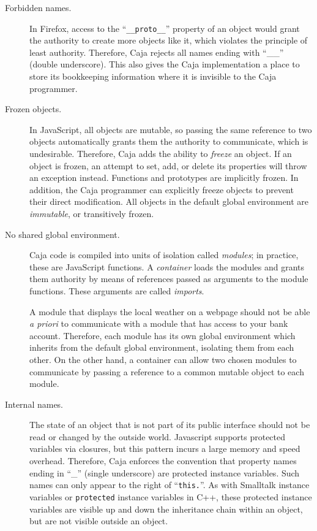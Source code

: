 \documentclass[letterpaper,twocolumn,10pt]{article}
\newcommand{\code}[1]{{\tt {#1}}}              %
\begin{document}
\begin{description}

  \item[Forbidden names.] In Firefox, access to the ``\code{\_\_proto\_\_}'' 
  property of an object would grant the authority to create more objects
  like it, which violates the principle of least authority.  Therefore, 
  Caja rejects all names ending with ``\_\_'' (double 
  underscore). This also gives the Caja implementation a place to store its 
  bookkeeping information where it is invisible to the Caja programmer.
 
  \item[Frozen objects.] In JavaScript, all objects are mutable, so passing
  the same reference to two objects automatically grants them the authority
  to communicate, which is undesirable.  
  Therefore, Caja adds the ability to \emph{freeze} an 
  object. If an object is frozen, an attempt to set, add, or 
  delete its properties will throw an exception instead. Functions and 
  prototypes are implicitly frozen. In addition, the Caja programmer can 
  explicitly freeze objects to prevent their direct modification. All objects 
  in the default global environment are \emph{immutable}, or transitively 
  frozen.
  
  \item[No shared global environment.] Caja code is compiled into units of
  isolation called \emph{modules}; in practice, these are JavaScript functions.  
  A \emph{container} loads the modules and grants them authority by means of 
  references passed as arguments to the module functions.  These arguments
  are called \emph{imports}.
  
  A module that displays the local 
  weather on a webpage should not be able \emph{a priori} to communicate 
  with a module that has access to your bank account. Therefore, each 
  module has its own global environment which inherits 
  from the default global environment, isolating them from each other.
  On the other hand, a container can allow two chosen modules to communicate
  by passing a reference to a common mutable object to each module.

  \item[Internal names.] The state of an object that is not part of its 
  public interface should not be read or changed by the outside world.  
  Javascript supports protected variables via closures, but this pattern 
  incurs a large memory and speed overhead.  Therefore, Caja enforces the
  convention that property names ending in ``\_'' (single underscore) 
  are protected instance variables.  Such names can only appear to the 
  right of ``\code{this.}''. As with Smalltalk instance variables or 
  \code{protected} instance variables in C++, these protected instance 
  variables are visible up and down the inheritance chain within an object, 
  but are not visible outside an object.


\end{description}
\end{document}
